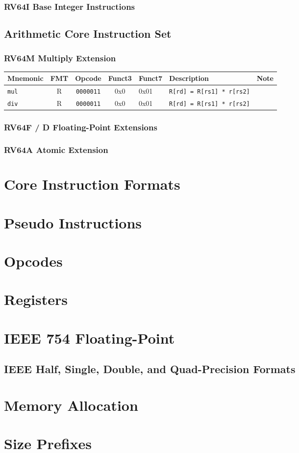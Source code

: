 \documentclass{article}
\newcommand{\code}[1]{\texttt{#1}}
\begin{document}
\subsubsection*{RV64I Base Integer Instructions}

\subsection*{Arithmetic Core Instruction Set}

\subsubsection*{RV64M Multiply Extension}
\begin{tabular}
{l | c | c | c | l | l | r}
Mnemonic    & FMT   & Opcode         & Funct3 & Funct7  & Description   & Note \\ \hline
\code{mul}  & R     & \code{0000011} & 0x0    & 0x01 &\code{R[rd] = R[rs1] * r[rs2]} \\
\code{div}  & R     & \code{0000011} & 0x0    & 0x01 &\code{R[rd] = R[rs1] * r[rs2]} \\
\end{tabular}

\subsubsection*{RV64F / D Floating-Point Extensions}

\subsubsection*{RV64A Atomic Extension}

\section*{Core Instruction Formats}

\section*{Pseudo Instructions}

\section*{Opcodes}

\section*{Registers}

\section*{IEEE 754 Floating-Point}

\subsection*{IEEE Half, Single, Double, and Quad-Precision Formats}

\section*{Memory Allocation}

\section*{Size Prefixes}
\end{document}
